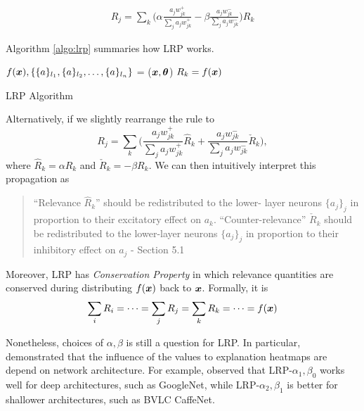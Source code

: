 \begin{align}
	R_j = \sum_{k} 	\bigg( \alpha\frac{a_j w_{jk}^+}{\sum_{j} a_jw_{jk}^+} - \beta\frac{a_j w_{jk}^-}{\sum_{j} a_jw_{jk}^-} \bigg )  R_{k}
\end{align}

Algorithm \ref{algo:lrp} summaries how LRP works.

\begin{algorithm}[H]
$f(\patvector{x}), \{ \{a\}_{l_1}, \{a\}_{l_2}, \dots, \{a\}_{l_n}\}$ = ($\patvector{x}, \patvector{\theta}$)\;
$R_k = f(\patvector{x})$\;
 \caption{LRP Algorithm}
 \label{algo:lrp}
\end{algorithm}


Alternatively, if we slightly rearrange  the rule to 
$$
	R_j = \sum_{k} \bigg( \frac{a_j w_{jk}^+}{\sum_{j} a_jw_{jk}^+} \hat{R}_{k} + \frac{a_j w_{jk}^-}{\sum_{j} a_jw_{jk}^-} \check{R}_{k} \bigg),
$$ 
where $\hat{R}_{k}  = \alpha R_{k}$ and  $\check{R}_{k} = -\beta R_{k} $. We can then intuitively interpret this propagation as 

\begin{quote}
``Relevance $\hat{R}_k$'' should be redistributed to the lower-
layer neurons $\{a_j\}_j$ in proportion to their excitatory effect on $a_k$. ``Counter-relevance'' $\check{R}_k $ should be redistributed to the lower-layer neurons $\{a_j\}_j$ in proportion to their inhibitory effect on $a_j$
	- Section 5.1 \cite{MontavonMethodsInterpretingUnderstanding2017}
\end{quote} 



Moreover, LRP has \textit{Conservation Property} in which relevance quantities are conserved during distributing $f(\patvector{x})$ back to $\boldsymbol{x}$. Formally, it is 
\begin{align}
	\sum_{i} R_i =  \cdots =	\sum_{j} R_j = \sum_{k} R_k = \cdots = f(\patvector{x})
\end{align}


Nonetheless, choices of $\alpha,\beta$ is still a question for LRP.  In particular, \cite{MontavonMethodsInterpretingUnderstanding2017, BinderLayerWiseRelevancePropagation2016} demonstrated that the influence of the values to explanation heatmaps are depend on network architecture. For example, \cite{MontavonMethodsInterpretingUnderstanding2017} observed that LRP-${\alpha_1, \beta_0}$ works well for deep architectures, such as GoogleNet\cite{SzegedyGoingDeeperConvolutions2014}, while LRP-${\alpha_2, \beta_1}$ is better for shallower architectures, such as BVLC CaffeNet\cite{JiaCaffeConvolutionalArchitecture2014}.


